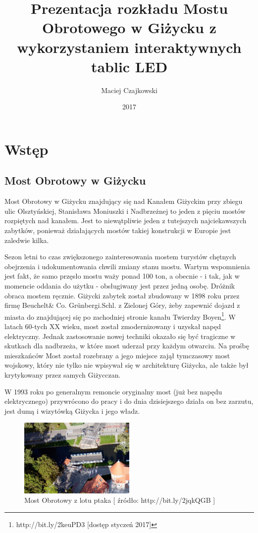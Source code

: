 \documentclass[wmii,inf,mgr]{uwmthesis}
\date{2017}
\title{Prezentacja rozkładu Mostu Obrotowego w Giżycku z wykorzystaniem interaktywnych tablic LED}
\author{Maciej Czajkowski}
\begin{document}
	
\maketitle
	
\tableofcontents

\chapter*{Wstęp}
\section{Most Obrotowy w Giżycku}
	Most Obrotowy w Giżycku znajdujący się nad Kanałem Giżyckim przy zbiegu ulic Olsztyńskiej, Stanisława Moniuszki i Nadbrzeżnej to jeden z pięciu mostów rozpiętych nad kanałem. Jest to niewątpliwie jeden z tutejszych najciekawszych zabytków, ponieważ działających mostów takiej konstrukcji w Europie jest zaledwie kilka. \par
	Sezon letni to czas zwiększonego zainteresowania mostem turystów chętnych obejrzenia i udokumentowania chwili zmiany stanu mostu. Wartym wspomnienia jest fakt, że samo przęsło mostu waży ponad 100 ton, a obecnie - i tak, jak w momencie oddania do użytku - obsługiwany jest przez jedną osobę. Dróżnik obraca mostem ręcznie. Giżycki zabytek został zbudowany w 1898 roku przez firmę Beuchelt& Co. Grünbergi.Schl. z Zielonej Góry, żeby zapewnić dojazd z miasta do znajdującej się po zachodniej stronie kanału Twierdzy Boyen\footnote{http://bit.ly/2keuPD3 [dostęp styczeń 2017]}. W latach 60-tych XX wieku, most został zmodernizowany i uzyskał napęd elektryczny. Jednak zastosowanie nowej techniki okazało się być tragiczne w skutkach dla nadbrzeża, w które most uderzał przy każdym otwarciu. Na prośbę mieszkańców Most został rozebrany a jego miejsce zajął tymczasowy most wojskowy, który nie tylko nie wpisywał się w architekturę Giżycka, ale także był krytykowany przez samych Giżycczan. \par
	W 1993 roku po generalnym remoncie oryginalny most (już bez napędu elektrycznego) przywrócono do pracy i do dnia dzisiejszego działa on bez zarzutu, jest dumą i wizytówką Giżycka i jego władz. \par
\begin{figure}[h]
\centering
\includegraphics[width=0.5\textwidth]{obraz1}
\caption{Most Obrotowy z lotu ptaka [ źródło: http://bit.ly/2jqkQGB ]}
\end{figure}
\end{document}
